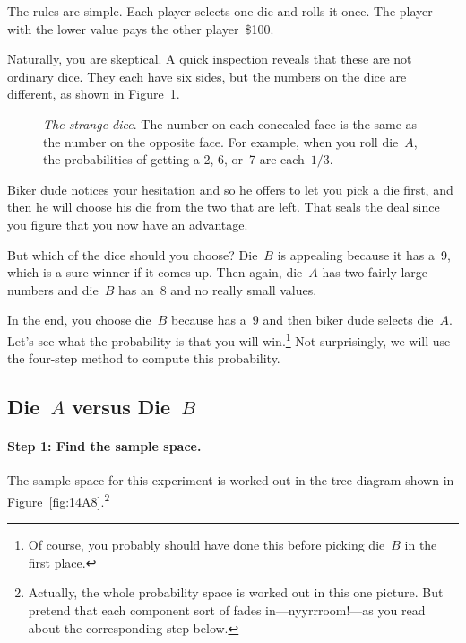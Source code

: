 The rules are simple.  Each player selects one die and rolls it once.
The player with the lower value pays the other player~\$100.

Naturally, you are skeptical.  A quick inspection reveals that these
are not ordinary dice.  They each have six sides, but the numbers on
the dice are different, as shown in Figure~\ref{fig:14A7}.

\begin{figure}


\caption{\emph{The strange dice}.  The number on each concealed face
  is the same as the number on the opposite face.  For example, when
  you roll die~$A$, the probabilities of getting a 2, 6, or~7 are
  each~$1/3$.}

\label{fig:14A7}

\end{figure}

Biker dude notices your hesitation and so he offers to let you pick a
die first, and then he will choose his die from the two that are
left.  That seals the deal since you figure that you now have an
advantage.

But which of the dice should you choose?  Die~$B$ is appealing because
it has a~9, which is a sure winner if it comes up.  Then again,
die~$A$ has two fairly large numbers and die~$B$ has an~8 and no
really small values.

In the end, you choose die~$B$ because has a~9 and then biker dude
selects die~$A$.  Let's see what the probability is that you will
win.\footnote{Of course, you probably should have done this before
  picking die~$B$ in the first place.}
Not surprisingly, we will use the four-step method to compute this
probability.

\subsection{Die~$A$ versus Die~$B$}

\paragraph{Step 1: Find the sample space.}

The sample space for this experiment is worked out in the tree diagram
shown in Figure~\ref{fig:14A8}.\footnote{Actually, the whole
  probability space is worked out in this one picture.  But pretend
  that each component sort of fades in---nyyrrroom!---as you read
  about the corresponding step below.}

